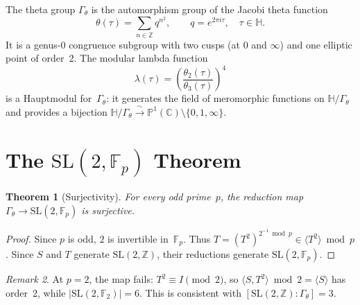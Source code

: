 \documentclass[12pt]{amsart}
\newtheorem{theorem}{Theorem}[section]
\theoremstyle{definition}
\theoremstyle{remark}
\newtheorem{remark}[theorem]{Remark}
\newcommand{\SL}{\mathrm{SL}}
\newcommand{\Fp}{\mathbb{F}_p}
\newcommand{\Z}{\mathbb{Z}}
\newcommand{\C}{\mathbb{C}}
\newcommand{\HH}{\mathbb{H}}
\newcommand{\PP}{\mathbb{P}}
\newcommand{\Gtheta}{\Gamma_\theta}
\begin{document}
The theta group $\Gtheta$ is the automorphism group of the Jacobi theta
function
\begin{equation}\label{eq:theta-fn}
\theta(\tau) = \sum_{n \in \Z} q^{n^2}, \qquad q = e^{2\pi i\tau},
\quad \tau \in \HH.
\end{equation}
It is a genus-0 congruence subgroup with two cusps (at $0$ and $\infty$)
and one elliptic point of order~2.  The modular lambda function
\begin{equation}\label{eq:lambda}
\lambda(\tau) = \left(\frac{\theta_2(\tau)}{\theta_3(\tau)}\right)^4
\end{equation}
is a Hauptmodul for~$\Gtheta$: it generates the field of meromorphic
functions on $\HH/\Gtheta$ and provides a bijection
$\HH/\Gtheta \xrightarrow{\;\sim\;} \PP^1(\C) \setminus \{0,1,\infty\}$.

\section{The $\SL(2,\Fp)$ Theorem}\label{sec:sl2fp}

\begin{theorem}[Surjectivity]\label{thm:surject}
For every odd prime~$p$, the reduction map
$\Gtheta \to \SL(2,\Fp)$ is surjective.
\end{theorem}

\begin{proof}
Since $p$ is odd, $2$ is invertible in~$\Fp$.  Thus
$T = (T^2)^{2^{-1}\bmod p} \in \langle T^2\rangle \bmod p$.  Since
$S$ and $T$ generate $\SL(2,\Z)$, their reductions generate $\SL(2,\Fp)$.
\end{proof}

\begin{remark}
At $p = 2$, the map fails: $T^2 \equiv I \pmod{2}$, so
$\langle S, T^2\rangle \bmod 2 = \langle S\rangle$ has order~2, while
$|\SL(2,\mathbb{F}_2)| = 6$.  This is consistent with
$[\SL(2,\Z) : \Gtheta] = 3$.
\end{remark}
\end{document}
